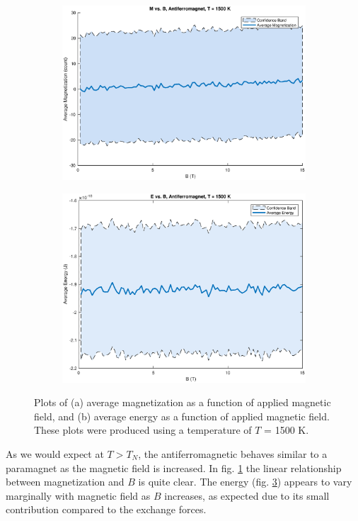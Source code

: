 \documentclass[12pt]{article}
\begin{document}
\begin{figure}[!h]
\begin{subfigure}{0.5\textwidth}
\includegraphics[width=\linewidth]{./Antiferrographs/antiferroMvsB.eps}
\caption{\label{antiferroMvsB}}
\end{subfigure}
\begin{subfigure}{0.5\textwidth}
\includegraphics[width=\linewidth]{./Antiferrographs/antiferroEvsB.eps}
\caption{\label{antiferroEvsB}}
\end{subfigure}
\caption{Plots of (a) average magnetization as a function of applied magnetic field, and (b) average energy as a function of applied magnetic field.  These plots were produced using a temperature of $T$ = 1500 K.}  
\end{figure}
As we would expect at $T > T_N$, the antiferromagnetic behaves similar to a paramagnet as the magnetic field is increased.  In fig. \ref{antiferroMvsB} the linear relationship between magnetization and $B$ is quite clear.  The energy (fig. \ref{antiferroEvsB}) appears to vary marginally with magnetic field as $B$ increases, as expected due to its small contribution compared to the exchange forces.
\end{document}
